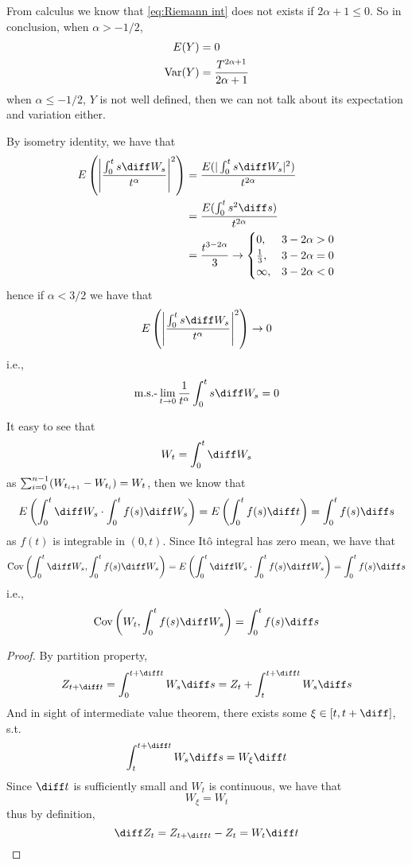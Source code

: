\begin{subproblem}[(\arabic*).]
        From calculus we know that \cref{eq:Riemann int} does
        not exists if $2\alpha+1\leq 0$.
        So in conclusion,
        when $\alpha>-1/2$,
        \[\begin{aligned}
            E(Y)&=0\\
            \mathrm{Var}(Y)&=\frac{T^{2\alpha+1}}{2\alpha+1}
        \end{aligned}\]
        when $\alpha\leq -1/2$, $Y$ is not well defined, then
        we can not talk about its expectation and variation either.
    \end{subproblem}

    \problem
    By isometry identity, we have that
    \[\begin{aligned}
        E\left(
            \left|\frac{\int_0^ts\diff W_s}{t^\alpha}\right|^2
        \right)&=\frac{E(|\int_0^ts\diff W_s|^2)}{t^{2\alpha}}\\
        &=\frac{E(\int_0^ts^2\diff s)}{t^{2\alpha}}\\
        &=\frac{t^{3-2\alpha}}{3}\to
        \begin{cases}
            0,&3-2\alpha>0\\
            \frac{1}{3},&3-2\alpha=0\\
            \infty,&3-2\alpha<0
        \end{cases}
    \end{aligned}\]
    hence if $\alpha<3/2$ we have that
    \[E\left(
            \left|\frac{\int_0^ts\diff W_s}{t^\alpha}\right|^2
        \right)\to 0\]
    i.e.,
    \[\text{m.s.-}\lim_{t\to0}\frac{1}{t^\alpha}\int_0^ts\diff W_s=0\]

    \problem
    It easy to see that
    \[W_t=\int_0^t\diff W_s\]
    as $\sum_{i=0}^{n-1}(W_{t_{i+1}}-W_{t_i})=W_t$,
    then we know that
    \[E\left(\int_0^t\diff W_s\cdot\int_0^tf(s)\diff W_s\right)
    =E\left(\int_0^tf(s)\diff t\right)=\int_0^tf(s)\diff s\]
    as $f(t)$ is integrable in $(0,t)$.
    Since It\^o integral has zero mean, we have that
    \[\begin{aligned}
        \cov\left(\int_0^t\diff W_s,\int_0^tf(s)\diff W_s\right)
        =E\left(\int_0^t\diff W_s\cdot\int_0^tf(s)\diff W_s\right)
        =\int_0^tf(s)\diff s
    \end{aligned}\]
    i.e.,
    \[\cov\left(W_t,\int_0^tf(s)\diff W_s\right)=
    \int_0^tf(s)\diff s\]

    \problem
    \label{dZt}
    \begin{proof}
        By partition property,
        \[Z_{t+\diff t}=\int_0^{t+\diff t}W_s\diff s
        =Z_t+\int_t^{t+\diff t}W_s\diff s\]
        And in sight of intermediate value theorem, there exists some
        $\xi\in[t,t+\diff]$, s.t.
        \[\int_t^{t+\diff t}W_s\diff s
        =W_\xi\diff t\]
        Since $\diff t$ is sufficiently small and $W_t$ is continuous,
        we have that
        \[W_\xi=W_t\]
        thus by definition,
        \[\diff Z_t=Z_{t+\diff t}-Z_t=W_t\diff t\]
    \end{proof}

